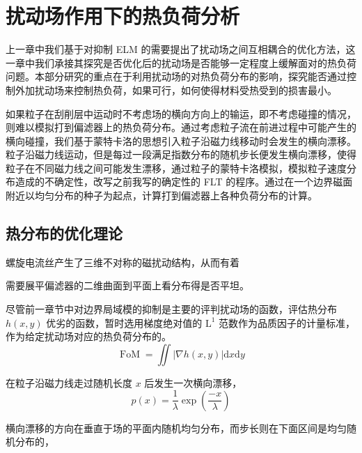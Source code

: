 \chapter{扰动场作用下的热负荷分析}



上一章中我们基于对抑制 ELM 的需要提出了扰动场之间互相耦合的优化方法，这一章中我们承接其探究是否优化后的扰动场是否能够一定程度上缓解\Hmode 面对的热负荷问题。本部分研究的重点在于利用扰动场的对热负荷分布的影响，探究能否通过控制外加扰动场来控制热负荷，如果可行，如何使得材料受热受到的损害最小。


如果粒子在刮削层中运动时不考虑场的横向方向上的输运，即不考虑碰撞的情况，则难以模拟打到偏滤器上的热负荷分布。通过考虑粒子流在前进过程中可能产生的横向碰撞，我们基于蒙特卡洛的思想引入粒子沿磁力线移动时会发生的横向漂移。
粒子沿磁力线运动，但是每过一段满足指数分布的随机步长便发生横向漂移，使得粒子在不同磁力线之间可能发生漂移，通过粒子的蒙特卡洛模拟，模拟粒子速度分布造成的不确定性，改写之前我写的确定性的 FLT 的程序。通过在一个边界磁面附近以均匀分布的种子为起点，计算打到偏滤器上各种负荷分布的计算。

\section{热分布的优化理论}
螺旋电流丝产生了三维不对称的磁扰动结构，从而有着

需要展平偏滤器的二维曲面到平面上看分布得是否平坦。

尽管前一章节中对边界局域模的抑制是主要的评判扰动场的函数，评估热分布 $h(x,y)$ 优劣的函数，暂时选用梯度绝对值的 $\mathrm{L}^1$ 范数作为品质因子的计量标准，作为给定扰动场对应的热负荷分布的。
\begin{equation}
    \operatorname{FoM} =  \iint |\nabla h(x,y)| \mathrm{d} x \mathrm{d} y
\end{equation}

\begin{figure}[htbp]
    \centering
\end{figure}


在粒子沿磁力线走过随机长度 $x$ 后发生一次横向漂移，
\begin{equation}
    p(x)=\frac{1}{\lambda} \exp \left(\frac{-x}{\lambda}\right)
\end{equation}

横向漂移的方向在垂直于场的平面内随机均匀分布，而步长则在下面区间是均匀随机分布的，

